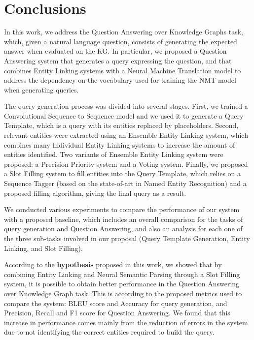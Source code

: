\chapter{Conclusions}
\label{cap6:conclusions}
In this work, we address the Question Answering over Knowledge Graphs task, which, given a natural 
language question, consists of generating the expected answer when evaluated on the KG. In particular, 
we proposed a Question Answering system that generates a \SPARQL{} query expressing the question, and that 
combines Entity Linking systems with a Neural Machine Translation model to address the dependency on the 
vocabulary used for training the NMT model when generating \SPARQL{} queries.

The \SPARQL{} query generation process was divided into several stages. First, we trained a 
Convolutional Sequence to Sequence model and we used it to generate a Query Template, which is a 
\SPARQL{} query with its entities replaced by placeholders. Second, relevant entities were extracted 
using an Ensemble Entity Linking system, which combines many Individual Entity Linking systems to 
increase the amount of entities identified. Two variants of Ensemble Entity Linking system were 
proposed: a Precision Priority system and a Voting system. Finally, we proposed a Slot Filling system 
to fill entities into the Query Template, which relies on a Sequence Tagger (based on the 
state-of-art in Named Entity Recognition) and a proposed filling algorithm, giving the final \SPARQL{} 
query as a result.

We conducted various experiments to compare the performance of our system with a proposed baseline, 
which includes an overall comparison for the tasks of \SPARQL{} query generation and Question Answering, 
and also an analysis for each one of the three sub-tasks involved in our proposal (Query Template 
Generation, Entity Linking, and Slot Filling).

According to the \textbf{hypothesis} proposed in this work, we showed that by combining Entity 
Linking and Neural Semantic Parsing through a Slot Filling system, it is possible to obtain better 
performance in the Question Answering over Knowledge Graph task. This is according to the proposed 
metrics used to compare the system: BLEU score and Accuracy for \SPARQL{} query generation, and Precision, 
Recall and F1 score for Question Answering. We found that this increase in performance comes mainly 
from the reduction of errors in the system due to not identifying the correct entities required to 
build the \SPARQL{} query.

